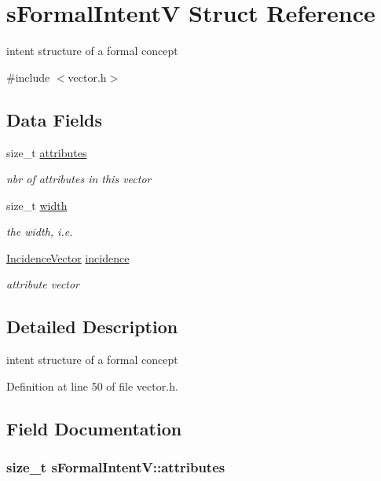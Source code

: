 \hypertarget{structsFormalIntentV}{\section{s\-Formal\-Intent\-V \-Struct \-Reference}
\label{structsFormalIntentV}
}


intent structure of a formal concept  




{\ttfamily \#include $<$vector.\-h$>$}

\subsection*{\-Data \-Fields}
\begin{DoxyCompactItemize}
\item 
size\-\_\-t \hyperlink{structsFormalIntentV_addf2a15164915bd6dbc77d4ff48325de}{attributes}
\begin{DoxyCompactList}\small\item\em nbr of attributes in this vector \end{DoxyCompactList}\item 
size\-\_\-t \hyperlink{structsFormalIntentV_a70711ba6edc09660adb6a838ef8d1555}{width}
\begin{DoxyCompactList}\small\item\em the width, i.\-e. \end{DoxyCompactList}\item 
\hyperlink{vector_8h_aae617489ac88fff15979050721fe581f}{\-Incidence\-Vector} \hyperlink{structsFormalIntentV_af2b03b37318f9292907b0f09c599cc30}{incidence}
\begin{DoxyCompactList}\small\item\em attribute vector \end{DoxyCompactList}\end{DoxyCompactItemize}


\subsection{\-Detailed \-Description}
intent structure of a formal concept 

\-Definition at line 50 of file vector.\-h.



\subsection{\-Field \-Documentation}
\hypertarget{structsFormalIntentV_addf2a15164915bd6dbc77d4ff48325de}{
\subsubsection[{attributes}]{\setlength{\rightskip}{0pt plus 5cm}size\-\_\-t {\bf s\-Formal\-Intent\-V\-::attributes}}}\label{structsFormalIntentV_addf2a15164915bd6dbc77d4ff48325de}


